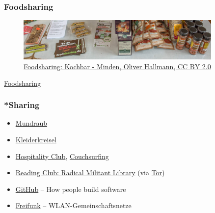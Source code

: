 \begin{frame}
	\frametitle{Foodsharing}

	\begin{figure}
		\includegraphics[width=0.9\textwidth]{../../img/foodsharing-cut.jpg}
		\caption[Foodsharing by Oliver Hallmann, Ausschnitt]{\href{https://flic.kr/p/kCmbVx}{{Foodsharing: Kochbar - Minden}, Oliver Hallmann, CC BY 2.0}}
	\end{figure}

	\href{https://foodsharing.de/}{Foodsharing}
\end{frame}

\begin{frame}
	\frametitle{*Sharing}

	\begin{itemize}
		\item \href{http://mundraub.org/}{Mundraub}
		\item \href{https://www.kleiderkreisel.de/}{Kleiderkreisel}
		\item \href{http://www.hospitalityclub.org/}{Hospitality Club}, \href{http://couchsurfing.org/}{Couchsurfing}
		\item \href{http://c3jemx2ube5v5zpg.onion/}{Reading Club: Radical Militant Library} (via \href{https://www.torproject.org/}{Tor})
		\item \href{https://github.com/}{GitHub} – How people build software
		\item \href{https://freifunk.net//}{Freifunk} – WLAN-Gemeinschaftsnetze
	\end{itemize}
\end{frame}
